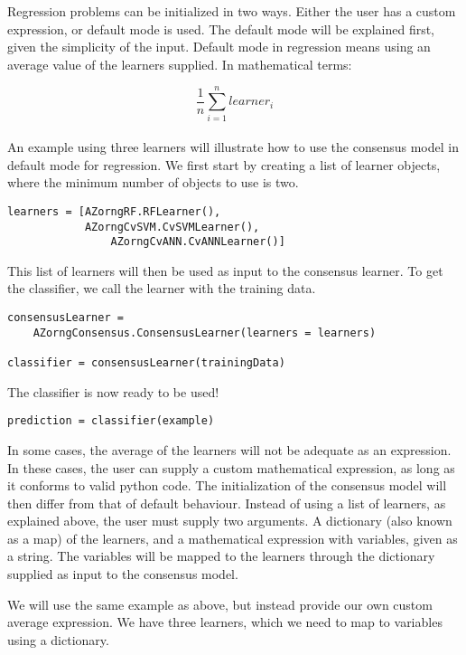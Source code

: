 \documentclass[12pt]{article}
\begin{document}
Regression problems can be initialized in two ways. Either the user has a custom
expression, or default mode is used. The default mode will be explained first, given
the simplicity of the input. Default mode in regression means using an average value
of the learners supplied. In mathematical terms:

\begin{equation}
  \frac{1}{n} \sum_{i=1}^n learner_i
\end{equation}
\\

An example using three learners will illustrate how to use the consensus model in 
default mode for regression. We first start by creating a list of learner objects,
where the minimum number of objects to use is two.

\begin{verbatim}
learners = [AZorngRF.RFLearner(), 
            AZorngCvSVM.CvSVMLearner(),
	            AZorngCvANN.CvANNLearner()]
\end{verbatim}

This list of learners will then be used as input to the consensus learner. To get
the classifier, we call the learner with the training data.

\begin{verbatim}
consensusLearner = 
    AZorngConsensus.ConsensusLearner(learners = learners)

classifier = consensusLearner(trainingData)
\end{verbatim}

The classifier is now ready to be used! 

\begin{verbatim}
prediction = classifier(example)
\end{verbatim}

\newpage
In some cases, the average of the learners will not be adequate as an expression.
In these cases, the user can supply a custom mathematical expression, as long
as it conforms to valid python code. The initialization of the consensus model will
then differ from that of default behaviour. Instead of using a list of learners,
as explained above, the user must supply two arguments. A dictionary (also known
as a map) of the learners, and a mathematical expression with variables, given as a string.
The variables will be mapped to the learners through the dictionary supplied as
input to the consensus model.

We will use the same example as above, but instead provide our own custom 
average expression. We have three learners, which we need to map to variables
using a dictionary.
\end{document}

